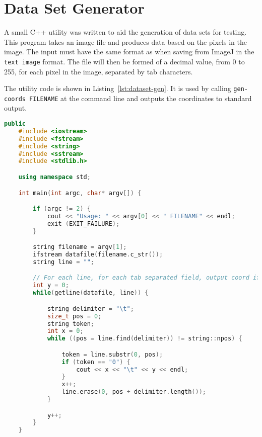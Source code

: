 
\chapter{Data Set Generator}
\label{sec:dataset_generator}

A small C++ utility was written to aid the generation of data sets for testing.
This program takes an image file and produces data based on the pixels in the
image. The input must have the same format as when saving from ImageJ in the
\texttt{text image} format. The file will then be formed of a decimal value,
from 0 to 255, for each pixel in the image, separated by tab characters.

The utility code is shown in Listing~\ref{lst:dataset-gen}. It is used by
calling \texttt{gen-coords FILENAME} at the command line and outputs the
coordinates to standard output.

\begin{center}
\begin{minipage}{\textwidth}
	\begin{lstlisting}[caption={Utility to gen data sets from images.},
	label=lst:dataset-gen, language=c++, linewidth=12cm, firstnumber=1] public
	#include <iostream>
	#include <fstream>
	#include <string>
	#include <sstream>
	#include <stdlib.h>

	using namespace std;

	int main(int argc, char* argv[]) {

		if (argc != 2) {
			cout << "Usage: " << argv[0] << " FILENAME" << endl;
			exit (EXIT_FAILURE);
		}

		string filename = argv[1];
		ifstream datafile(filename.c_str());
		string line = "";

		// For each line, for each tab separated field, output coord if 0.
		int y = 0;
		while(getline(datafile, line)) {

			string delimiter = "\t";
			size_t pos = 0;
			string token;
			int x = 0;
			while ((pos = line.find(delimiter)) != string::npos) {

				token = line.substr(0, pos);
				if (token == "0") {
					cout << x << "\t" << y << endl;
				}
				x++;
				line.erase(0, pos + delimiter.length());
			}

			y++;
		}
	}
\end{lstlisting}
\end{minipage}
\end{center}
